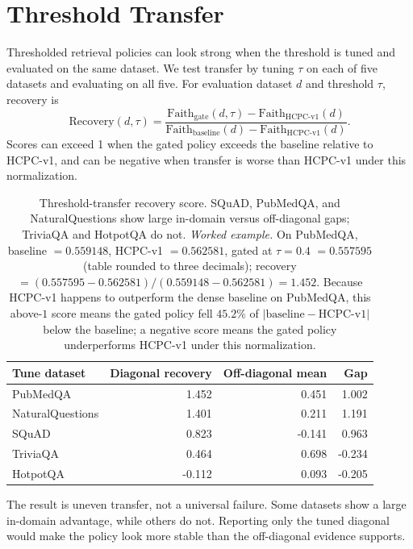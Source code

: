 \section{Threshold Transfer}
\label{sec:threshold_transfer}

Thresholded retrieval policies can look strong when the threshold is tuned and
evaluated on the same dataset. We test transfer by tuning \(\tau\) on each of
five datasets and evaluating on all five. For evaluation dataset \(d\) and
threshold \(\tau\), recovery is
\[
\mathrm{Recovery}(d,\tau) =
\frac{\mathrm{Faith}_{\mathrm{gate}}(d,\tau) -
\mathrm{Faith}_{\mathrm{HCPC}\mbox{-}\mathrm{v1}}(d)}
{\mathrm{Faith}_{\mathrm{baseline}}(d) -
\mathrm{Faith}_{\mathrm{HCPC}\mbox{-}\mathrm{v1}}(d)}.
\]
Scores can exceed 1 when the gated policy exceeds the baseline relative to
HCPC-v1, and can be negative when transfer is worse than HCPC-v1 under this
normalization.

\begin{table}[H]
\centering
\small
\caption{Threshold-transfer recovery score. SQuAD, PubMedQA, and
NaturalQuestions show large in-domain versus off-diagonal gaps; TriviaQA
and HotpotQA do not. \emph{Worked example.} On PubMedQA, baseline
$=0.559148$, HCPC-v1 $=0.562581$, gated at $\tau{=}0.4$ $=0.557595$
(table rounded to three decimals); recovery $=
(0.557595-0.562581)/(0.559148-0.562581)=1.452$. Because HCPC-v1 happens
to outperform the dense baseline on PubMedQA, this above-$1$ score means
the gated policy fell $45.2\%$ of $|\text{baseline}-\text{HCPC-v1}|$
below the baseline; a negative score means the gated policy underperforms
HCPC-v1 under this normalization.}
\label{tab:tauflags}
\begin{tabular}{lrrr}
\toprule
Tune dataset & Diagonal recovery & Off-diagonal mean & Gap \\
\midrule
PubMedQA & 1.452 & 0.451 & 1.002 \\
NaturalQuestions & 1.401 & 0.211 & 1.191 \\
SQuAD & 0.823 & -0.141 & 0.963 \\
TriviaQA & 0.464 & 0.698 & -0.234 \\
HotpotQA & -0.112 & 0.093 & -0.205 \\
\bottomrule
\end{tabular}
\end{table}

The result is uneven transfer, not a universal failure. Some datasets show a
large in-domain advantage, while others do not. Reporting only the tuned
diagonal would make the policy look more stable than the off-diagonal evidence
supports.

